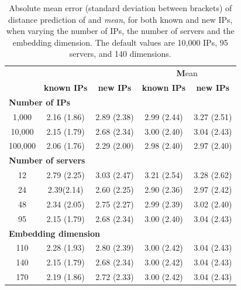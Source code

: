 \begin{table}
	\centering
		\begin{tabular}{|c|c|c|c|c|}
			\multicolumn{1}{c}{} & \multicolumn{2}{c|}{\bf \system{}} & \multicolumn{2}{c}{\textbf Mean}\\
			\cline{2-5}
			\multicolumn{1}{c}{} & \textbf{known IPs} & \textbf{new IPs}& \textbf{known IPs} & \multicolumn{1}{c}{\textbf{new IPs}}\\
			\hline
			\multicolumn{5}{l}{\bf Number of IPs}\\
			\hline
			1,000 & 2.16 (1.86) & 2.89 (2.38) & 2.99 (2.44) & 3.27 (2.51) \\
			10,000 & 2.15 (1.79) & 2.68 (2.34) & 3.00 (2.40) & 3.04 (2.43) \\
			100,000 & 2.06 (1.76) & 2.29 (2.00) & 2.98 (2.40) & 2.97 (2.40) \\
			\hline
			\multicolumn{5}{l}{\bf Number of servers} \\
			\hline
			12 & 2.79 (2.25) & 3.03 (2.47) & 3.21 (2.54) & 3.28 (2.62) \\
			24 & 2.39(2.14) & 2.60 (2.25) & 2.90 (2.36) & 2.97 (2.42) \\
			48 & 2.34 (2.05) & 2.75 (2.27) & 2.99 (2.39) & 3.02 (2.40) \\
			95 & 2.15 (1.79) & 2.68 (2.34) & 3.00 (2.40) & 3.04 (2.43) \\
			\hline
			\multicolumn{5}{l}{\bf Embedding dimension} \\
			\hline
			110 & 2.28 (1.93) & 2.80 (2.39) & 3.00 (2.42) & 3.04 (2.43) \\
			140 & 2.15 (1.79) & 2.68 (2.34) & 3.00 (2.42) & 3.04 (2.43) \\
			170 & 2.19 (1.86) & 2.72 (2.33) & 3.00 (2.42) & 3.04 (2.43) \\
			\hline
	\end{tabular}
   
	\caption{Absolute mean error (standard deviation between brackets) of distance prediction of \system{} and {\em mean}, for both known and new IPs, when varying the number of IPs, the number of servers and the embedding dimension. The default values are 10,000 IPs, 95 servers, and 140 dimensions.}
	\label{tab:abserror}
\end{table}



